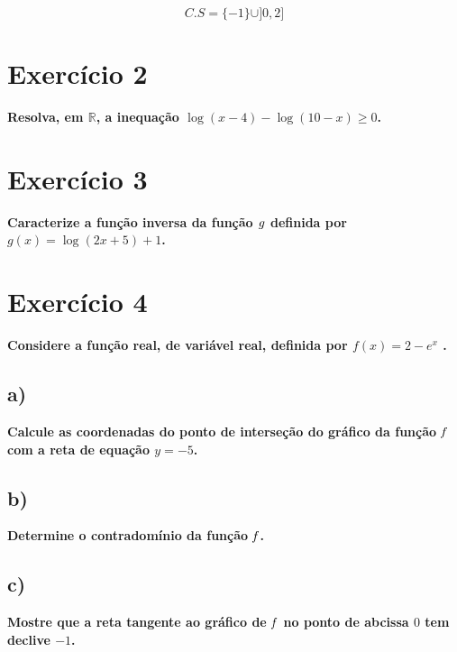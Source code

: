 \documentclass[a4paper]{article}
\begin{document}
\[C.S=\{-1\} \cup ]0,2]\]


\section*{Exercício 2}\textbf{Resolva, em $\mathbb{R}$, a inequação $\log(x - 4) - \log(10 - x) \geq 0$.}

\section*{Exercício 3}\textbf{Caracterize a função inversa da função $\it{g}$ definida por $g(x) = \log(2x + 5) + 1$.}

\section*{Exercício 4}\textbf{Considere a função real, de variável real, definida por $f(x) = 2 - e^x$ .}

\subsection*{a)}\textbf{Calcule as coordenadas do ponto de interseção do gráfico da função $\it{f}$ com a reta de equação $y = -5$.}

\subsection*{b)}\textbf{Determine o contradomínio da função $\it{f}$.}
\subsection*{c)}\textbf{Mostre que a reta tangente ao gráfico de $\it{f}$ no ponto de abcissa $0$ tem declive $-1$.}
\end{document}
